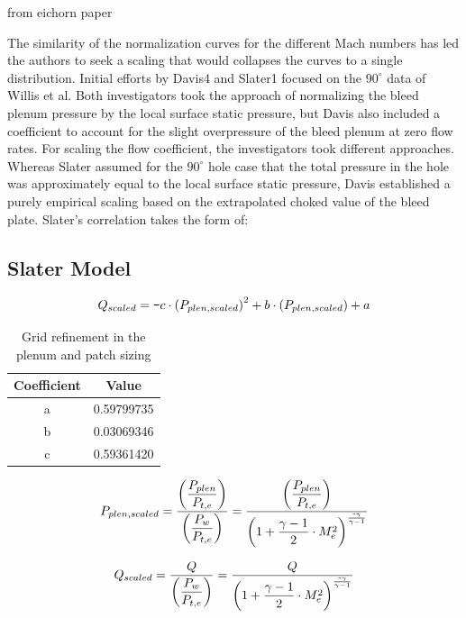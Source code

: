 \documentclass{article}
\newcommand{\minus}{\texttt{-}}
\begin{document}
from eichorn paper

The similarity of the normalization curves for the different Mach numbers has led the authors to seek a scaling that would collapses the curves to a single distribution. Initial efforts by Davis4 and Slater1 focused on the $90^\circ$ data of Willis et al. Both investigators took the approach of normalizing the bleed plenum pressure by the local surface static pressure, but Davis also included a coefficient to account for the slight overpressure of the bleed plenum at zero flow rates. For scaling the flow coefficient, the investigators took different approaches. Whereas Slater assumed for the $90^\circ$ hole case that the total pressure in the hole was approximately equal to the local surface static pressure, Davis established a purely empirical scaling based on the extrapolated choked value of the bleed plate. Slater’s correlation takes the form of:

\subsection{Slater Model}


$$ Q_{scaled} = \minus c \cdot \qty(P_{plen, scaled})^2 + b\cdot \qty(P_{plen, scaled}) + a$$


\begin{table}[!htbp] \centering 
\begin{tabular}[c]{*{2}{c}} \hline
\textbf{Coefficient} & \textbf{Value}   \\ \hline
a   & 0.59799735  \\ 
b   & 0.03069346  \\ 
c   & 0.59361420  \\ \hline
\end{tabular} 
\caption{Grid refinement in the plenum and patch sizing} 
\label{tab:slater} \end{table}

$$ P_{plen,scaled} = \dfrac{\qty(\dfrac{P_{plen}}{P_{t,e}})}{\qty(\dfrac{P_w}{P_{t,e}})} = \dfrac{\qty(\dfrac{P_{plen}}{P_{t,e}})}{\qty(1+\dfrac{\gamma-1}{2}\cdot M^2_e)^{\frac{\minus\gamma}{\gamma-1}}} $$


$$ Q_{scaled} = \dfrac{Q}{\qty(\dfrac{P_w}{P_{t,e}})} = \dfrac{Q}{\qty(1+\dfrac{\gamma-1}{2}\cdot M^2_e)^{\frac{\minus\gamma}{\gamma-1}}} $$
\end{document}
